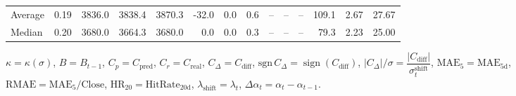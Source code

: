 \begin{threeparttable}
{\begin{tabular}{lrrrrrrrrrrrrr}
Average &     0.19 & 3836.0 & 3838.4 & 3870.3 &      -32.0 &                      0.0 &                 0.6 &         -- &        -- &             -- &            109.1 &            2.67 &                  27.67 \\
 Median &     0.20 & 3680.0 & 3664.3 & 3680.0 &        0.0 &                      0.0 &                 0.3 &         -- &        -- &             -- &             79.3 &            2.23 &                  25.00 \\
\bottomrule
\end{tabular}
}
\begin{tablenotes}\footnotesize
\item $\kappa=\kappa(\sigma)$, $B=B_{t-1}$, $C_p=C_{\text{pred}}$, $C_r=C_{\text{real}}$, $C_\Delta=C_{\text{diff}}$, $\mathrm{sgn}\,C_\Delta=\operatorname{sign}(C_{\text{diff}})$, $|C_\Delta|/\sigma=\dfrac{|C_{\text{diff}}|}{\sigma_t^{\text{shift}}}$, $\mathrm{MAE}_5=\mathrm{MAE}_{5\text{d}}$, $\mathrm{RMAE}= \mathrm{MAE}_5 / \text{Close}$, $\mathrm{HR}_{20}=\mathrm{HitRate}_{20\text{d}}$, 
$\lambda_{\text{shift}}=\lambda_t$, 
$\Delta\alpha_t=\alpha_t-\alpha_{t-1}$.
\end{tablenotes}
\end{threeparttable}
\endgroup

